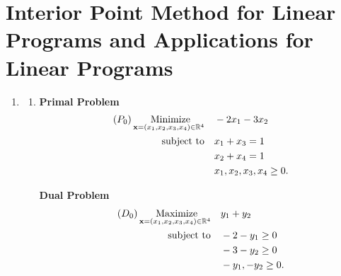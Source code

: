 \section{Interior Point Method for Linear Programs and Applications for Linear Programs}
\begin{enumerate}
    \item \begin{enumerate}[label=(\alph*)]
              \item
                    \begin{minipage}[t]{0.45\textwidth}
                        \textbf{Primal Problem}
                        \begin{align*}
                            (P_0) \, \underset{\mathbf{x} = (x_1, x_2, x_3, x_4) \in \mathbb{R}^4}{\text{ Minimize}} \quad & -2x_1 - 3x_2               \\
                            \text{subject to} \quad                                                          & x_1 + x_3 = 1              \\
                                                                                                             & x_2 + x_4 = 1              \\
                                                                                                             & x_1, x_2, x_3, x_4 \geq 0. \\
                        \end{align*}
                    \end{minipage}
                    \hfill
                    \begin{minipage}[t]{0.45\textwidth}
                        \textbf{Dual Problem}
                        \begin{align*}
                            (D_0) \, \underset{\mathbf{x} = (x_1, x_2, x_3, x_4) \in \mathbb{R}^4}{\text{ Maximize}} \quad & y_1 + y_2          \\
                            \text{subject to} \quad                                                          & -2 - y_1 \geq 0    \\
                                                                                                             & -3 - y_2 \geq 0    \\
                                                                                                             & -y_1, -y_2 \geq 0. \\
                        \end{align*}
                    \end{minipage}


\end{enumerate}
\end{enumerate}
